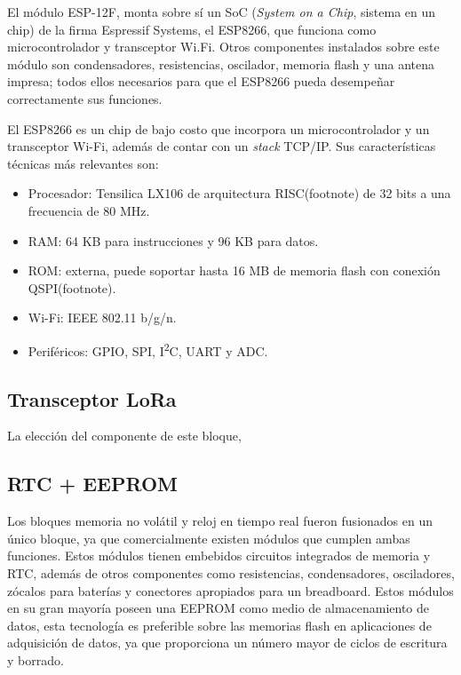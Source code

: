 
El módulo ESP-12F, monta sobre sí un SoC (\textit{System on a Chip}, sistema en un chip) de la firma Espressif Systems, el ESP8266, que funciona como microcontrolador y transceptor Wi.Fi. Otros componentes instalados sobre este módulo son condensadores, resistencias, oscilador, memoria flash y una antena impresa; todos ellos necesarios para que el ESP8266 pueda desempeñar correctamente sus funciones.

El ESP8266 es un chip de bajo costo que incorpora un microcontrolador y un transceptor Wi-Fi, además de contar con un \textit{stack} TCP/IP. Sus características técnicas más relevantes son:
\begin{itemize}
	\item Procesador: Tensilica LX106 de arquitectura RISC(footnote) de 32 bits a una frecuencia de 80 MHz.
	\item RAM: 64 KB para instrucciones y 96 KB para datos.
	\item ROM: externa, puede soportar hasta 16 MB de memoria flash con conexión QSPI(footnote).
	\item Wi-Fi: IEEE 802.11 b/g/n.
	\item Periféricos: GPIO, SPI, I\textsuperscript{2}C, UART y ADC.
\end{itemize}

\subsection{Transceptor LoRa}

La elección del componente de este bloque, 

\subsection{RTC + EEPROM}

Los bloques memoria no volátil y reloj en tiempo real fueron fusionados en un único bloque, ya que comercialmente existen módulos que cumplen ambas funciones. Estos módulos tienen embebidos circuitos integrados de memoria y RTC, además de otros componentes como resistencias, condensadores, osciladores, zócalos para baterías y conectores apropiados para un breadboard. Estos módulos en su gran mayoría poseen una EEPROM como medio de almacenamiento de datos, esta tecnología es preferible sobre las memorias flash en aplicaciones de adquisición de datos, ya que proporciona un número mayor de ciclos de escritura y borrado.

